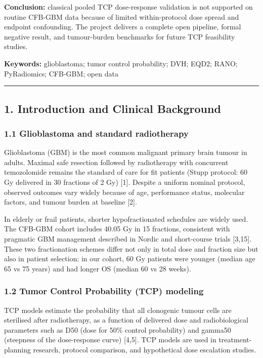 \documentclass[
  11pt,
]{article}
\begin{document}
\textbf{Conclusion:} classical pooled TCP dose-response validation is
not supported on routine CFB-GBM data because of limited within-protocol
dose spread and endpoint confounding. The project delivers a complete
open pipeline, formal negative result, and tumour-burden benchmarks for
future TCP feasibility studies.

\textbf{Keywords:} glioblastoma; tumor control probability; DVH; EQD2;
RANO; PyRadiomics; CFB-GBM; open data

\begin{center}\rule{0.5\linewidth}{0.5pt}\end{center}

\subsection{1. Introduction and Clinical
Background}\label{introduction-and-clinical-background}

\subsubsection{1.1 Glioblastoma and standard
radiotherapy}\label{glioblastoma-and-standard-radiotherapy}

Glioblastoma (GBM) is the most common malignant primary brain tumour in
adults. Maximal safe resection followed by radiotherapy with concurrent
temozolomide remains the standard of care for fit patients (Stupp
protocol: 60 Gy delivered in 30 fractions of 2 Gy) {[}1{]}. Despite a
uniform nominal protocol, observed outcomes vary widely because of age,
performance status, molecular factors, and tumour burden at baseline
{[}2{]}.

In elderly or frail patients, shorter hypofractionated schedules are
widely used. The CFB-GBM cohort includes 40.05 Gy in 15 fractions,
consistent with pragmatic GBM management described in Nordic and
short-course trials {[}3,15{]}. These two fractionation schemes differ
not only in total dose and fraction size but also in patient selection:
in our cohort, 60 Gy patients were younger (median age 65 vs 75 years)
and had longer OS (median 60 vs 28 weeks).

\subsubsection{1.2 Tumor Control Probability (TCP)
modeling}\label{tumor-control-probability-tcp-modeling}

TCP models estimate the probability that all clonogenic tumour cells are
sterilised after radiotherapy, as a function of delivered dose and
radiobiological parameters such as D50 (dose for 50\% control
probability) and gamma50 (steepness of the dose-response curve)
{[}4,5{]}. TCP models are used in treatment-planning research, protocol
comparison, and hypothetical dose escalation studies.
\end{document}
